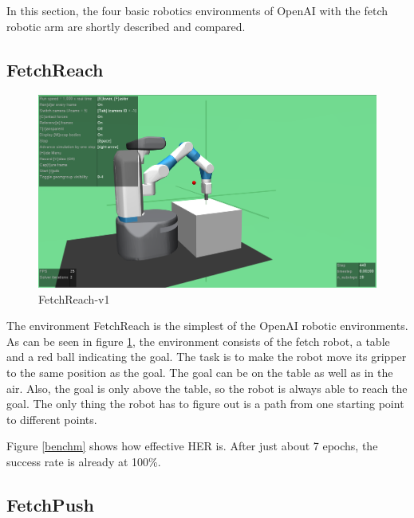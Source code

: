 In this section, the four basic robotics environments of OpenAI with the fetch robotic arm are shortly described and compared.

\subsection{FetchReach}

\begin{figure} [h]
	
	\centering
	\includegraphics[width=1\textwidth]{figures/FetchReach-v1.png}
	\caption{FetchReach-v1}
	\label{reach1}
\end{figure} 

The environment FetchReach is the simplest of the OpenAI robotic environments. As can be seen in figure \ref{reach1}, the environment consists of the fetch robot, a table and a red ball indicating the goal. The task is to make the robot move its gripper to the same position as the goal. The goal can be on the table as well as in the air. Also, the goal is only above the table, so the robot is always able to reach the goal. The only thing the robot has to figure out is a path from one starting point to different points.

\vspace{0.5cm}

Figure \ref{benchm} shows how effective HER is.  After just about 7 epochs, the success rate is already at 100\%.




\subsection{FetchPush}

